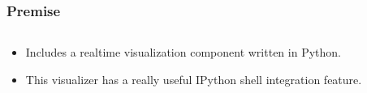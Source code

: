 \documentclass{beamer}
\begin{document}
\begin{frame}
  \frametitle{Premise}

  \begin{columns}[T]
    \begin{column}{.5\textwidth}
      \begin{itemize}
      \item Includes a realtime visualization component written in Python.

      \item This visualizer has a really useful IPython shell integration
        feature.


      \end{itemize}


\end{column}
\end{columns}
\end{frame}
\end{document}
